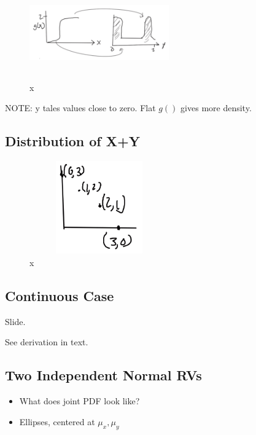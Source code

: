 
\begin{figure}[h]
\centering
\includegraphics[width=6cm, height=4cm]{images/L11/strictly_monotonic.jpeg}
\caption{x}
\end{figure}

NOTE: y tales values close to zero. Flat $g()$ gives more density.

\subsection{Distribution of X+Y}


\begin{figure}[h]
\centering
\includegraphics[width=6cm, height=4cm]{images/L11/dist_x_y.jpeg}
\caption{x}
\end{figure}

\subsection{Continuous Case}


Slide.

See derivation in text.

\subsection{Two Independent Normal RVs}


\begin{itemize}
    \item What does joint PDF look like?
    \item Ellipses, centered at $\mu_x, \mu_y$
\end{itemize}

